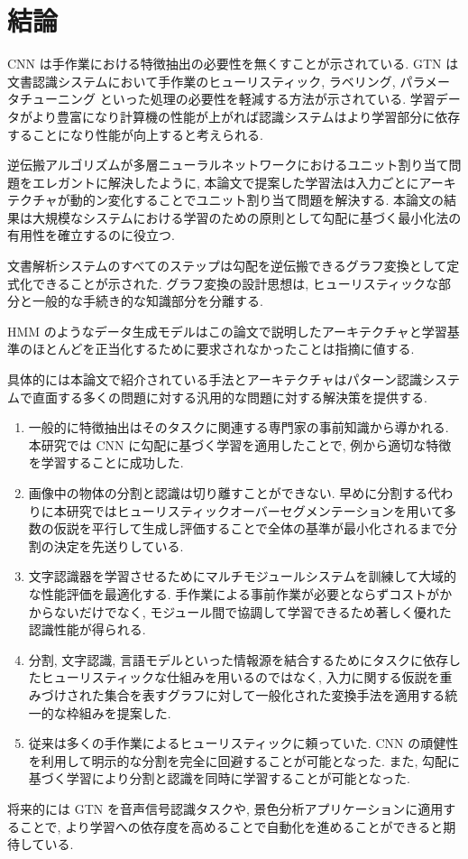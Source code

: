 \documentclass[twocolumn]{jarticle}     %
\begin{document}
\section{結論}
CNN は手作業における特徴抽出の必要性を無くすことが示されている. GTN は文書認識システムにおいて手作業のヒューリスティック, ラベリング, パラメータチューニング といった処理の必要性を軽減する方法が示されている. 学習データがより豊富になり計算機の性能が上がれば認識システムはより学習部分に依存することになり性能が向上すると考えられる. 
\par
逆伝搬アルゴリズムが多層ニューラルネットワークにおけるユニット割り当て問題をエレガントに解決したように, 本論文で提案した学習法は入力ごとにアーキテクチャが動的ン変化することでユニット割り当て問題を解決する. 本論文の結果は大規模なシステムにおける学習のための原則として勾配に基づく最小化法の有用性を確立するのに役立つ.\par
文書解析システムのすべてのステップは勾配を逆伝搬できるグラフ変換として定式化できることが示された. グラフ変換の設計思想は, ヒューリスティックな部分と一般的な手続き的な知識部分を分離する. \par
HMM のようなデータ生成モデルはこの論文で説明したアーキテクチャと学習基準のほとんどを正当化するために要求されなかったことは指摘に値する.
\par
具体的には本論文で紹介されている手法とアーキテクチャはパターン認識システムで直面する多くの問題に対する汎用的な問題に対する解決策を提供する.
\begin{enumerate}
  \item 一般的に特徴抽出はそのタスクに関連する専門家の事前知識から導かれる. 本研究では CNN に勾配に基づく学習を適用したことで, 例から適切な特徴を学習することに成功した.
  \item 画像中の物体の分割と認識は切り離すことができない. 早めに分割する代わりに本研究ではヒューリスティックオーバーセグメンテーションを用いて多数の仮説を平行して生成し評価することで全体の基準が最小化されるまで分割の決定を先送りしている.
  \item 文字認識器を学習させるためにマルチモジュールシステムを訓練して大域的な性能評価を最適化する. 手作業による事前作業が必要とならずコストがかからないだけでなく, モジュール間で協調して学習できるため著しく優れた認識性能が得られる.
  \item 分割, 文字認識, 言語モデルといった情報源を結合するためにタスクに依存したヒューリスティックな仕組みを用いるのではなく, 入力に関する仮説を重みづけされた集合を表すグラフに対して一般化された変換手法を適用する統一的な枠組みを提案した. 
  \item 従来は多くの手作業によるヒューリスティックに頼っていた. CNN の頑健性を利用して明示的な分割を完全に回避することが可能となった. また, 勾配に基づく学習により分割と認識を同時に学習することが可能となった.
\end{enumerate}
将来的には GTN を音声信号認識タスクや, 景色分析アプリケーションに適用することで, より学習への依存度を高めることで自動化を進めることができると期待している.




\end{document}
